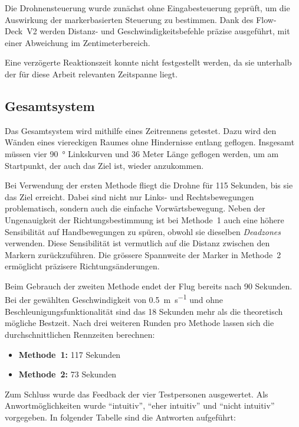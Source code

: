 Die Drohnensteuerung wurde zunächst ohne Eingabesteuerung geprüft, um die Auswirkung der markerbasierten Steuerung zu bestimmen.
Dank des Flow-Deck~V2 werden Distanz- und Geschwindigkeitsbefehle präzise ausgeführt, mit einer Abweichung im Zentimeterbereich.

Eine verzögerte Reaktionszeit konnte nicht festgestellt werden, da sie unterhalb der für diese Arbeit relevanten Zeitspanne liegt.

\subsection{Gesamtsystem}
\label{sec:whsy}

Das Gesamtsystem wird mithilfe eines Zeitrennens getestet.
Dazu wird den Wänden eines viereckigen Raumes ohne Hindernisse entlang geflogen.
Insgesamt müssen vier \SI{90}{\degree} Linkskurven und \si{36} Meter Länge geflogen werden, um am Startpunkt, der auch das Ziel ist, wieder anzukommen.

Bei Verwendung der ersten Methode fliegt die Drohne für \si{115} Sekunden, bis sie das Ziel erreicht.
Dabei sind nicht nur Links- und Rechtsbewegungen problematisch, sondern auch die einfache Vorwärtsbewegung.
Neben der Ungenauigkeit der Richtungsbestimmung ist bei Methode~1 auch eine höhere Sensibilität auf Handbewegungen zu spüren, obwohl sie dieselben \textit{Deadzones} verwenden.
Diese Sensibilität ist vermutlich auf die Distanz zwischen den Markern zurückzuführen.
Die grössere Spannweite der Marker in Methode~2 ermöglicht präzisere Richtungsänderungen.

Beim Gebrauch der zweiten Methode endet der Flug bereits nach \si{90} Sekunden. 
Bei der gewählten Geschwindigkeit von \SI{0.5}{\meter\per\second} und ohne Beschleunigungsfunktionalität sind das \si{18} Sekunden mehr als die theoretisch mögliche Bestzeit.\footnotemark{}
Nach drei weiteren Runden pro Methode lassen sich die durchschnittlichen Rennzeiten berechnen:

\begin{itemize}
    \item \textbf{Methode~1:} \si{117} Sekunden
    \item \textbf{Methode~2:} \si{73} Sekunden
\end{itemize}

Zum Schluss wurde das Feedback der vier Testpersonen ausgewertet.
Als Anwortmöglichkeiten wurde \enquote{intuitiv}, \enquote{eher intuitiv} und \enquote{nicht intuitiv} vorgegeben.
In folgender Tabelle sind die Antworten aufgeführt:

